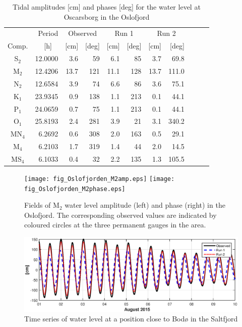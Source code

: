 \begin{table}[ht]
\caption{Tidal amplitudes [cm] and phases [deg] for the water level at Oscarsborg in the Oslofjord}
\label{tab:Oscarsborg}
\centering
\begin{tabular}{crrrrrrrrrr} \hline
      & Period & \multicolumn{2}{c}{Observed} & \multicolumn{2}{c}{Run 1} & \multicolumn{2}{c}{Run 2}  \\
Comp. & [h] $\;\;$ & [cm] & [deg] & [cm] & [deg] & [cm] & [deg]  \\ \hline 
S$_2$  & 12.0000 &  3.6 &  59  &   6.1 &  85  &  3.7 &  69.8  \\
M$_2$  & 12.4206 & 13.7 & 121  &  11.1 & 128  & 13.7 & 111.0  \\
N$_2$  & 12.6584 &  3.9 &  74  &   6.6 &  86  &  3.6 &  75.1  \\
K$_1$  & 23.9345 &  0.9 & 138  &   1.1 & 213  &  0.1 &  44.1  \\
P$_1$  & 24.0659 &  0.7 &  75  &   1.1 & 213  &  0.1 &  44.1  \\
O$_1$  & 25.8193 &  2.4 & 281  &   3.9 &  21  &  3.1 & 340.2  \\
MN$_4$ &  6.2692 &  0.6 & 308  &   2.0 & 163  &  0.5 &  29.1  \\
M$_4$  &  6.2103 &  1.7 & 319  &   1.4 &  44  &  2.0 &  14.5  \\
MS$_4$ &  6.1033 &  0.4 &  32  &   2.2 & 135  &  1.3 & 105.5  \\ \hline 
\end{tabular}
\end{table}




\begin{figure}[!t]
\centering
\texttt{[image: fig\_Oslofjorden\_M2amp.eps]}
\texttt{[image: fig\_Oslofjorden\_M2phase.eps]}
\caption{Fields of M$_2$ water level amplitude (left) and phase (right) in the Oslofjord. The corresponding observed values are indicated by coloured circles at the three permanent gauges in the area.}
\label{fig:Oslofjord_tidal_fields}
\end{figure}


\begin{figure}[!t]
\centering
\includegraphics[width=\textwidth]{fig_Saltstraumen_timeseries}
\caption{Time series of water level at a position close to Bod{\o} in the Saltfjord}
\label{fig:Saltstraumen_timeseries}
\end{figure}


